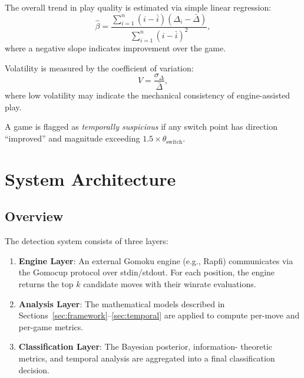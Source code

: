 \documentclass[11pt,a4paper]{article}
\begin{document}
The overall trend in play quality is estimated via simple linear regression:
\begin{equation}
    \hat{\beta} = \frac{\sum_{i=1}^{n}(i - \bar{i})(\Delta_i - \bar{\Delta})}
    {\sum_{i=1}^{n}(i - \bar{i})^2},
    \label{eq:trend_slope}
\end{equation}
where a negative slope indicates improvement over the game.

Volatility is measured by the coefficient of variation:
\begin{equation}
    V = \frac{\sigma_\Delta}{\bar{\Delta}},
    \label{eq:volatility}
\end{equation}
where low volatility may indicate the mechanical consistency of engine-assisted
play.

A game is flagged as \emph{temporally suspicious} if any switch point has
direction ``improved'' and magnitude exceeding $1.5 \times
\theta_{\text{switch}}$.


\section{System Architecture}
\label{sec:architecture}

\subsection{Overview}

The detection system consists of three layers:

\begin{enumerate}
    \item \textbf{Engine Layer}: An external Gomoku engine (e.g., Rapfi)
          communicates via the Gomocup protocol over stdin/stdout.
          For each position, the engine returns the top $k$ candidate moves
          with their winrate evaluations.
    \item \textbf{Analysis Layer}: The mathematical models described in
          Sections~\ref{sec:framework}--\ref{sec:temporal} are applied to
          compute per-move and per-game metrics.
    \item \textbf{Classification Layer}: The Bayesian posterior, information-
          theoretic metrics, and temporal analysis are aggregated into a final
          classification decision.
\end{enumerate}
\end{document}
